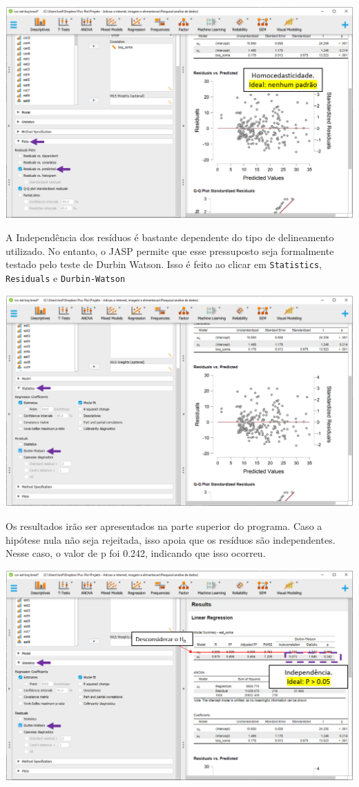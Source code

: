\documentclass[
]{book}
\begin{document}
\includegraphics{./img/cap_reg_homocedasticidade_jasp.png}

A Independência dos resíduos é bastante dependente do tipo de delineamento utilizado. No entanto, o JASP permite que esse pressuposto seja formalmente testado pelo teste de Durbin Watson. Isso é feito ao clicar em \texttt{Statistics}, \texttt{Residuals} e \texttt{Durbin-Watson}

\includegraphics{./img/cap_reg_independencia_jasp.png}

Os resultados irão ser apresentados na parte superior do programa. Caso a hipótese nula não seja rejeitada, isso apoia que os resíduos são independentes. Nesse caso, o valor de p foi 0.242, indicando que isso ocorreu.

\includegraphics{./img/cap_reg_independencia2_jasp.png}
\end{document}
